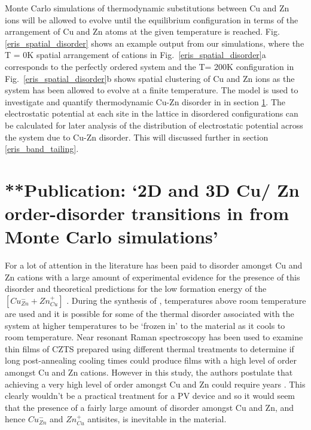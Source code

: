 \documentclass[11pt, twoside]{report}
\begin{document}
Monte Carlo simulations of thermodynamic substitutions between Cu and Zn ions will be allowed to evolve until the equilibrium configuration in terms of the arrangement of Cu and Zn atoms at the given temperature is reached. Fig. \ref{eris_spatial_disorder} shows an example output from our simulations, where the T = 0K spatial arrangement of cations in Fig.~\ref{eris_spatial_disorder}a corresponds to the perfectly ordered system and the T= 200K configuration in Fig.~\ref{eris_spatial_disorder}b shows spatial clustering of Cu and Zn ions as the system has been allowed to evolve at a finite temperature. The model is used to investigate and quantify thermodynamic Cu-Zn disorder in {\CZTS} in section \ref{CZTS_MC}. The electrostatic potential at each site in the lattice in disordered configurations can be calculated for later analysis of the distribution of electrostatic potential across the system due to Cu-Zn disorder. This will discussed further in section \ref{eris_band_tailing}. 




\section{**Publication: `2D and 3D Cu/ Zn order-disorder transitions in {\CZTS} from Monte Carlo simulations'}\label{CZTS_MC}
For {\CZTS} a lot of attention in the literature has been paid to disorder amongst Cu and Zn cations with a large amount of experimental evidence for the presence of this disorder \cite{Schorr, CZTS_Xray, CZTS_TEM} and theoretical predictions for the low formation energy of the  $[Cu_{Zn}^{-} + Zn_{Cu}^{+}]$ \cite{defects_Chen}.
During the synthesis of {\CZTS}, temperatures above room temperature are used and it is possible for some of the thermal disorder associated with the system at higher temperatures to be `frozen in' to the material as it cools to room temperature.
Near resonant Raman spectroscopy has been used to examine thin films of CZTS prepared using different thermal treatments to determine if long post-annealing cooling times could produce films with a high level of order amongst Cu and Zn cations. However in this study, the authors postulate that achieving a very high level of order amongst Cu and Zn could require years \cite{Katharina}. This clearly wouldn't be a practical treatment for a PV device and so it would seem that the presence of a fairly large amount of disorder amongst Cu and Zn, and hence $Cu_{Zn}^{-}$ and $Zn_{Cu}^{+}$ antisites,  is inevitable in the material. 
\end{document}

